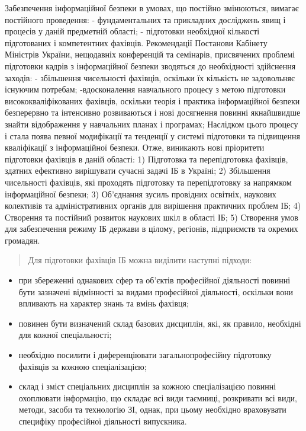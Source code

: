 \documentclass[oneside,final,14pt]{extreport}
\begin{document}
Забезпечення інформаційної безпеки в умовах, що постійно змінюються, вимагає постійного проведення:
- фундаментальних та прикладних досліджень явищ і процесів у даній предметній області;
- підготовки необхідної кількості підготованих і компетентних фахівців.
Рекомендації Постанови Кабінету Міністрів України, нещодавніх конференцій та семінарів, присвячених проблемі підготовки кадрів з інформаційної безпеки зводяться до необхідності здійснення заходів:
- збільшення чисельності фахівців, оскільки їх кількість не задовольняє існуючим потребам;
-вдосконалення навчального процесу з метою підготовки висококваліфікованих фахівців, оскільки теорія і практика інформаційної безпеки безперервно та інтенсивно розвиваються і нові досягнення повинні якнайшвидше знайти відображення у навчальних планах і програмах;
Наслідком цього процесу і стала поява певної модифікації та тенденції у системі підготовки та підвищення кваліфікації з інформаційної безпеки.
Отже, виникають нові пріоритети підготовки фахівців в даній області:
1) Підготовка та перепідготовка фахівців, здатних ефективно вирішувати сучасні задачі ІБ в Україні;
2) Збільшення чисельності фахівців, які проходять підготовку та перепідготовку за напрямком інформаційної безпеки;
3) Об'єднання зусиль провідних освітніх, наукових колективів та адміністративних органів для вирішення практичних проблем ІБ;
4)  Створення та постійний розвиток наукових шкіл в області ІБ;
5) Створення умов для забезпечення режиму ІБ держави в цілому, регіонів, підприємств та окремих громадян.
\begin{quote}

Для підготовки фахівців ІБ можна виділити наступні підходи:
\end{quote}
\begin{itemize}
\item {} 
при збереженні однакових сфер та об'єктів професійної діяльності повинні бути зазначені відмінності за видами професійної діяльності, оскільки вони впливають на характер знань та вмінь фахівця;

\item {} 
повинен бути визначений склад базових дисциплін, які, як правило, необхідні для кожної спеціальності;

\item {} 
необхідно посилити і диференціювати загальнопрофесійну підготовку фахівців за кожною спеціалізацією;

\item {} 
склад і зміст спеціальних дисциплін за кожною спеціалізацією повинні охоплювати інформацію, що складає всі види таємниці, розкривати всі види, методи, засоби та технологію ЗІ, однак, при цьому необхідно враховувати специфіку професійної діяльності випускника.

\end{itemize}
\end{document}

